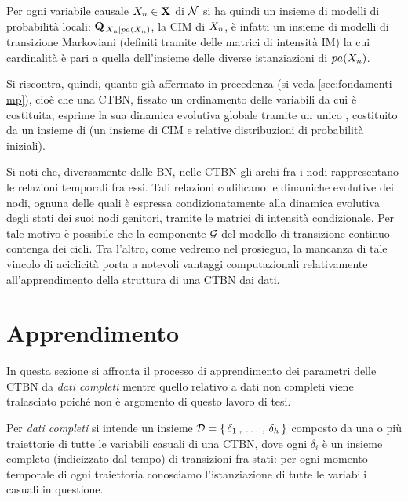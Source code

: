Per ogni variabile causale $\mathnormal{X_n} \in \mathbf{X}$ di $\mathcal{N}$ si ha quindi un insieme di modelli di probabilità locali: $\mathbf{Q}_{\,\mathnormal{X_n}|pa(\mathnormal{X_n})}$, la \acs{CIM} di $\mathnormal{X_n}$, è infatti un insieme di modelli di transizione Markoviani (definiti tramite delle matrici di intensità \acs{IM}) la cui cardinalità è pari a quella dell'insieme delle diverse istanziazioni di $pa(\mathnormal{X_n})$.

Si riscontra, quindi, quanto già affermato in precedenza (si veda \ref{sec:fondamenti-mp}), cioè che una \acs{CTBN}, fissato un ordinamento delle variabili da cui è costituita, esprime la sua dinamica evolutiva globale tramite un unico \homm\mprocess, costituito da un insieme di \conm\mprocess{} (un insieme di \acs{CIM} e relative distribuzioni di probabilità iniziali).

Si noti che, diversamente dalle \acl{BN}, nelle \acl{CTBN} gli archi fra i nodi rappresentano le relazioni temporali fra essi. Tali relazioni codificano le dinamiche evolutive dei nodi, ognuna delle quali è espressa condizionatamente alla dinamica evolutiva degli stati dei suoi nodi genitori, tramite le matrici di intensità condizionale. Per tale motivo è possibile che la componente $\mathcal{G}$ del modello di transizione continuo contenga dei cicli. Tra l'altro, come vedremo nel prosieguo, la mancanza di tale vincolo di aciclicità porta a notevoli vantaggi computazionali relativamente all'apprendimento della struttura di una \acs{CTBN} dai dati.

\section{Apprendimento}
\label{sec:ctbn-apprendimento}
In questa sezione si affronta il processo di apprendimento dei parametri delle \acl{CTBN} da \emph{dati completi} mentre quello relativo a dati non completi viene tralasciato poiché non è argomento di questo lavoro di tesi.

Per \emph{dati completi} si intende un insieme $\mathcal{D}=\{\,\delta_1\,,\,\dotsc\,,\,\delta_h\,\}$ composto da una o più traiettorie di tutte le variabili casuali di una \acs{CTBN}, dove ogni $\delta_i$ è un insieme completo (indicizzato dal tempo) di transizioni fra stati: per ogni momento temporale di ogni traiettoria conosciamo l'istanziazione di tutte le variabili casuali in questione.

